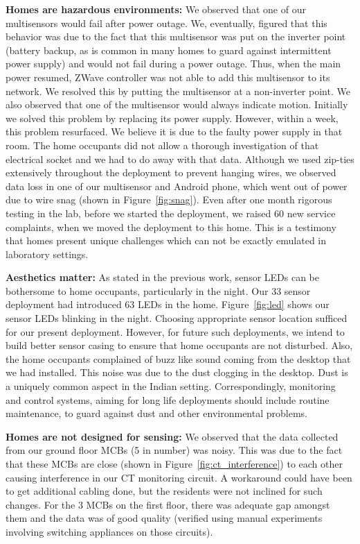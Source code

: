 \documentclass[10pt]{sensys-proc}
\newcommand{\figref}[1]{Figure~\ref{#1}}
\begin{document}
\noindent \textbf{Homes are hazardous environments:} We observed that one of our multisensors would fail after power outage. %
We, eventually, figured that this behavior was due to the fact that this multisensor was put on the inverter point (battery backup, as is common in many homes to guard against intermittent power supply) and would not fail during a power outage. Thus, when the main power resumed, ZWave controller was not able to add this multisensor to its network. We resolved this by putting the multisensor at a non-inverter point. We also observed that one of the multisensor would always indicate motion. Initially we solved this problem by replacing its power supply. However, within a week, this problem resurfaced. We believe it is due to the faulty power supply in that room. The home occupants did not allow a thorough investigation of that electrical socket and we had to do away with that data.
Although we used zip-ties extensively throughout the deployment to prevent hanging wires, we observed data loss in one of our multisensor and Android phone, which went out of power due to wire snag (shown in \figref{fig:snag}). Even after one month rigorous testing in the lab, before we started the deployment, we raised 60 new service complaints, when we moved the deployment to this home. This is a testimony that homes present unique challenges which can not be exactly emulated in laboratory settings.

\noindent \textbf{Aesthetics matter:} As stated in the previous work, sensor LEDs can be bothersome to home occupants, particularly in the night. Our 33 sensor deployment had introduced 63 LEDs in the home. \figref{fig:led} shows our sensor LEDs blinking in the night. Choosing appropriate sensor location sufficed for our present deployment. However, for future such deployments, we intend to build better sensor casing to ensure that home occupants are not disturbed. Also, the home occupants complained of buzz like sound coming from the desktop that we had installed. This noise was due to the dust clogging in the desktop. Dust is a uniquely common aspect in the Indian setting. Correspondingly, {monitoring and control systems, aiming for long life deployments should include routine maintenance, to guard against dust and other environmental problems.}

\noindent \textbf{Homes are not designed for sensing:} We observed that the data collected from our ground floor MCBs (5 in number) was noisy. This was due to the fact that these MCBs are close (shown in \figref{fig:ct_interference}) to each other causing interference in our CT monitoring circuit. A workaround could have been to get additional cabling done, but the residents were not inclined for such changes. For the 3 MCBs on the first floor, there was adequate gap amongst them and the data was of good quality (verified using manual experiments involving switching appliances on those circuits). %
\end{document}
